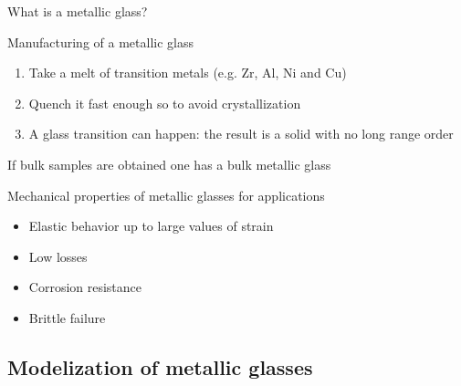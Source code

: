 \documentclass[compress]{beamer}
\begin{document}
	\begin{frame}{What is a metallic glass?}
		
		\begin{block}{Manufacturing of a metallic glass}
			
			\begin{enumerate}
				\item<1-> Take a melt of transition metals (e.g. Zr, Al, Ni and Cu)
				\item<2-> Quench it fast enough so to avoid crystallization  
				\item<3-> A glass transition can happen: the result is a solid with no long range order
			\end{enumerate}
			
			
			If bulk samples are obtained one has a bulk metallic glass
			
		\end{block}
		
		
		\begin{block}{Mechanical properties of metallic glasses for applications}
			
			\begin{itemize}
				\item<6-> Elastic behavior up to large values of strain\hspace{0.2cm} {\color{green} \Checkmark}
				\item<7-> Low losses\hspace{0.2cm} {\color{green} \Checkmark}
				\item<8-> Corrosion resistance\hspace{0.2cm} {\color{green} \Checkmark}
				\item<9-> Brittle failure\hspace{0.2cm} {\color{red} \XSolidBrush}
			\end{itemize}
	
		\end{block}
		
	\end{frame}
	
	\subsection{Modelization of metallic glasses}
	
\end{document}
